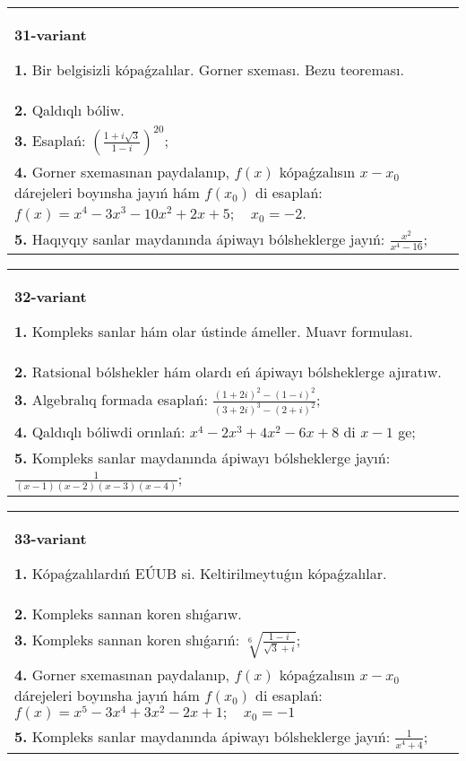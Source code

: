 \documentclass{article}
\begin{document}
\begin{tabular}{m{17cm}}
\textbf{31-variant}
\newline

\textbf{1.} Bir belgisizli kópaǵzalılar. Gorner sxeması. Bezu teoreması.  \\
\textbf{2.} Qaldıqlı bóliw.  \\
\textbf{3.} Esaplań:  $\left(\frac{1+i \sqrt{3}}{1-i}\right)^{20}$; \\
\textbf{4.} Gorner sxemasınan paydalanıp, $f(x)$ kópaǵzalısın $x-x_0$ dárejeleri boyınsha jayıń hám $f\left(x_0\right)$ di esaplań: $f(x)=x^4-3 x^3-10 x^2+2 x+5 ; \quad x_0=-2$. \\
\textbf{5.} Haqıyqıy sanlar maydanında ápiwayı bólsheklerge jayıń:  $\frac{x^2}{x^4-16}$; \\

\end{tabular}
\vspace{1cm}


\begin{tabular}{m{17cm}}
\textbf{32-variant}
\newline

\textbf{1.} Kompleks sanlar hám olar ústinde ámeller. Muavr formulası.  \\
\textbf{2.} Ratsional bólshekler hám olardı eń ápiwayı bólsheklerge ajıratıw. \\
\textbf{3.} Algebralıq formada esaplań:  $\frac{(1+2 i)^2-(1-i)^2}{(3+2 i)^3-(2+i)^2}$; \\
\textbf{4.} Qaldıqlı bóliwdi orınlań: $x^4-2 x^3+4 x^2-6 x+8$ di $x-1$ ge; \\
\textbf{5.} Kompleks sanlar maydanında ápiwayı bólsheklerge jayıń: $\frac{1}{(x-1)(x-2)(x-3)(x-4)}$; \\

\end{tabular}
\vspace{1cm}


\begin{tabular}{m{17cm}}
\textbf{33-variant}
\newline

\textbf{1.} Kópaǵzalılardıń EÚUB si. Keltirilmeytuǵın   kópaǵzalılar. \\
\textbf{2.} Kompleks sannan koren shıǵarıw. \\
\textbf{3.} Kompleks sannan koren shıǵarıń: $\sqrt[6]{\frac{1-i}{\sqrt{3}+i}}$; \\
\textbf{4.} Gorner sxemasınan paydalanıp, $f(x)$ kópaǵzalısın $x-x_0$ dárejeleri boyınsha jayıń hám $f\left(x_0\right)$ di esaplań: $f(x)=x^5-3 x^4+3 x^2-2 x+1 ; \quad x_0=-1$ \\
\textbf{5.} Kompleks sanlar maydanında ápiwayı bólsheklerge jayıń: $\frac{1}{x^4+4}$; \\

\end{tabular}
\vspace{1cm}
\end{document}
